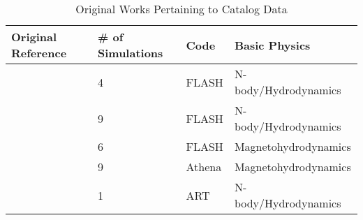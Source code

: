 \begin{table*}
\caption{Original Works Pertaining to Catalog Data\label{tab:sim_table}}
\begin{center}
\begin{tabular}{llll}
\hline
\hline
Original Reference & \# of Simulations & Code & Basic Physics \\
\hline
\citet{zuh10} & 4 & FLASH & N-body/Hydrodynamics \\
\citet{zuh11a} & 9 & FLASH & N-body/Hydrodynamics \\
\citet{zuh11b} & 6 & FLASH & Magnetohydrodynamics \\
\citet{zuh15} & 9 & Athena & Magnetohydrodynamics \\
\citet{nel14} & 1 & ART & N-body/Hydrodynamics \\
\hline
\end{tabular}
\end{center}
\end{table*}
